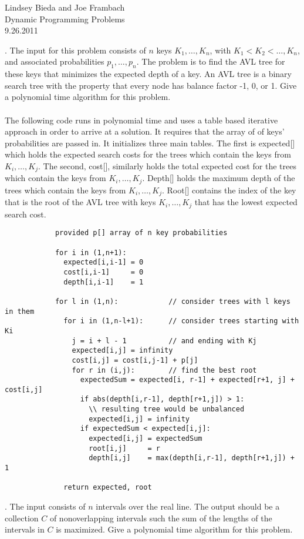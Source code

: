 \documentclass[10pt]{article}
\begin{document}
	\begin{flushright}
	Lindsey Bieda and Joe Frambach\\
	Dynamic Programming Problems\\
	9.26.2011
	\end{flushright}
	.	The input for this problem consists of $n$ keys $K_1, \ldots, K_n$, with $K_1 < K_2 < \ldots , K_n$, and associated
			probabilities $p_1, \ldots, p_n$. The problem is to find the AVL tree for these keys that minimizes the expected
			depth of a key.  An AVL tree is a binary search tree with the property that every node has balance
			factor -1, 0, or 1. Give a polynomial time algorithm for this problem.\\
			\\
			The following code runs in polynomial time and uses a table based iterative approach in order to arrive at a solution.
			It requires that the array of of keys' probabilities are passed in. It initializes three main tables. The first
			is expected[] which holds the expected search costs for the trees which contain the keys from $K_i, \ldots, K_j$.
			The second, cost[], similarly holds the total expected cost for the trees which contain the keys from $K_i, \ldots, K_j$.
			Depth[] holds the maximum depth of the trees which contain the keys from $K_i, \ldots, K_j$. Root[] contains the index
			of the key that is the root of the AVL tree with keys $K_i, \ldots, K_j$ that has the lowest expected search cost.
			\begin{verbatim}
			provided p[] array of n key probabilities 
			 
			for i in (1,n+1):
			  expected[i,i-1] = 0
			  cost[i,i-1]     = 0
			  depth[i,i-1]    = 1
			  
			for l in (1,n):            // consider trees with l keys in them
			  for i in (1,n-l+1):      // consider trees starting with Ki 
			    j = i + l - 1          // and ending with Kj
			    expected[i,j] = infinity
			    cost[i,j] = cost[i,j-1] + p[j]
			    for r in (i,j):        // find the best root
			      expectedSum = expected[i, r-1] + expected[r+1, j] + cost[i,j]
			      if abs(depth[i,r-1], depth[r+1,j]) > 1:
			        \\ resulting tree would be unbalanced
			        expected[i,j] = infinity
			      if expectedSum < expected[i,j]:
			        expected[i,j] = expectedSum
			        root[i,j]     = r
			        depth[i,j]    = max(depth[i,r-1], depth[r+1,j]) + 1
			        
			  return expected, root
			\end{verbatim}
	.	The input consists of $n$ intervals over the real line. The output should be a collection $C$  of nonoverlapping 
			intervals such the sum of the lengths of the intervals in $C$ is maximized. Give a polynomial
			time algorithm for this problem.\\
			\\
\end{document}
